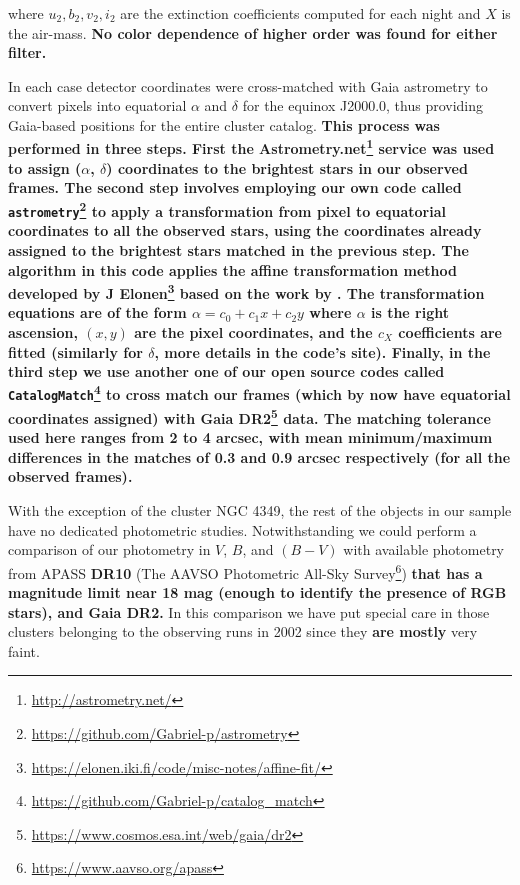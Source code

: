 \documentclass[referee]{aa}
\begin{document}
\noindent where $u_2, b_2, v_2, i_2$ are the extinction coefficients computed
for each night and $X$ is the air-mass. \textbf{No color dependence of higher
order was found for either filter.}

In each case detector coordinates were cross-matched with Gaia astrometry to
convert pixels into equatorial $\alpha$ and $\delta$ for the equinox J2000.0,
thus providing Gaia-based positions for the entire cluster catalog.
\textbf{
This process was performed in three steps. First the
Astrometry.net\footnote{\url{http://astrometry.net/}} service was used to
assign ($\alpha$, $\delta$) coordinates to the brightest stars in our observed
frames. The second step involves employing our own code called 
\texttt{astrometry}\footnote{\url{https://github.com/Gabriel-p/astrometry}} to
apply a transformation from pixel to equatorial coordinates to all the observed
stars, using the coordinates already assigned to the brightest stars matched in
the previous step. The algorithm in this code applies the affine transformation
method developed by
J Elonen\footnote{\url{https://elonen.iki.fi/code/misc-notes/affine-fit/}}
based on the work by \cite{Spath2004}. The transformation equations are of
the form $\alpha=c_0+c_1x+c_2y$ where $\alpha$ is the right ascension,
$(x, y)$ are the pixel coordinates, and the $c_X$ coefficients are fitted
(similarly for $\delta$, more details in the code's site).
Finally, in the third step we use another one of our open source codes called
\texttt{CatalogMatch}\footnote{\url{https://github.com/Gabriel-p/catalog_match}}
to cross match our frames (which by now have equatorial coordinates assigned)
with Gaia DR2\footnote{\url{https://www.cosmos.esa.int/web/gaia/dr2}} data. The
matching tolerance used here ranges from 2 to 4 arcsec, with mean
minimum/maximum differences in the matches of 0.3 and 0.9 arcsec
respectively (for all the observed frames).\\
}

With the exception of the cluster NGC 4349, the rest of the objects in our
sample have no dedicated photometric studies. Notwithstanding we could perform
a comparison of our photometry in $V$, \textbf{$B$}, and $(B-V)$ with available
photometry from APASS \textbf{DR10} (The AAVSO Photometric All-Sky
Survey\footnote{\url{https://www.aavso.org/apass}}) \textbf{that has a
magnitude limit near 18 mag (enough to identify the presence of RGB stars), and
Gaia DR2.}
%
In this comparison we have put special care in those clusters belonging to the
observing runs in 2002 since they \textbf{are mostly} very faint.
\end{document}
